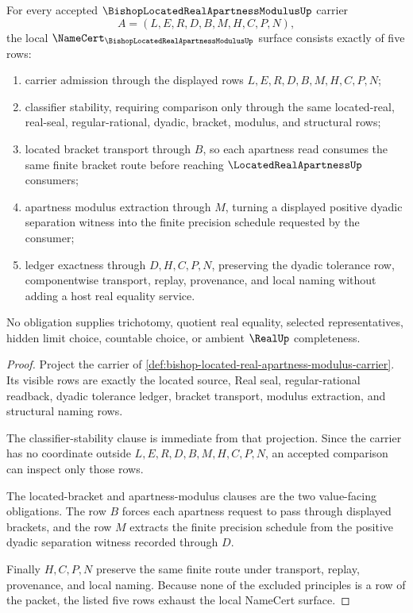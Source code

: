 \begin{theorem}
\label{thm:bishop-located-real-apartness-modulus-obligations}
For every accepted $\BishopLocatedRealApartnessModulusUp$ carrier
$$
A=(L,E,R,D,B,M,H,C,P,N),
$$
the local $\NameCert_{\BishopLocatedRealApartnessModulusUp}$ surface consists exactly of five rows:
\begin{enumerate}
\item carrier admission through the displayed rows $L,E,R,D,B,M,H,C,P,N$;
\item classifier stability, requiring comparison only through the same located-real, real-seal, regular-rational, dyadic, bracket, modulus, and structural rows;
\item located bracket transport through $B$, so each apartness read consumes the same finite bracket route before reaching $\LocatedRealApartnessUp$ consumers;
\item apartness modulus extraction through $M$, turning a displayed positive dyadic separation witness into the finite precision schedule requested by the consumer;
\item ledger exactness through $D,H,C,P,N$, preserving the dyadic tolerance row, componentwise transport, replay, provenance, and local naming without adding a host real equality service.
\end{enumerate}
No obligation supplies trichotomy, quotient real equality, selected representatives, hidden limit choice, countable choice, or ambient $\RealUp$ completeness.
\end{theorem}
\begin{proof}
Project the carrier of \autoref{def:bishop-located-real-apartness-modulus-carrier}. Its visible rows are exactly the located source, Real seal, regular-rational readback, dyadic tolerance ledger, bracket transport, modulus extraction, and structural naming rows.

The classifier-stability clause is immediate from that projection. Since the carrier has no coordinate outside $L,E,R,D,B,M,H,C,P,N$, an accepted comparison can inspect only those rows.

The located-bracket and apartness-modulus clauses are the two value-facing obligations. The row $B$ forces each apartness request to pass through displayed brackets, and the row $M$ extracts the finite precision schedule from the positive dyadic separation witness recorded through $D$.

Finally $H,C,P,N$ preserve the same finite route under transport, replay, provenance, and local naming. Because none of the excluded principles is a row of the packet, the listed five rows exhaust the local NameCert surface.
\end{proof}

